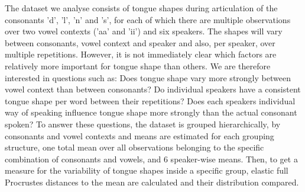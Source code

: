The dataset we analyse consists of tongue shapes during articulation of the consonants 'd', 'l', 'n' and 's', for each of which there are multiple observations over two vowel contexts ('aa' and 'ii') and six speakers.
The shapes will vary between consonants, vowel context and speaker and also, per speaker, over multiple repetitions.
However, it is not immediately clear which factors are relatively more important for tongue shape than others.
We are therefore interested in questions such as:
Does tongue shape vary more strongly between vowel context than between consonants?
Do individual speakers have a consistent tongue shape per word between their repetitions?
Does each speakers individual way of speaking influence tongue shape more strongly than the actual consonant spoken?
To answer these questions, the dataset is grouped hierarchically, by consonants and vowel contexts and means are estimated for each grouping structure, one total mean over all observations belonging to the specific combination of consonants and vowels, and 6 speaker-wise means.
Then, to get a measure for the variability of tongue shapes inside a specific group, elastic full Procrustes distances to the mean are calculated and their distribution compared.

